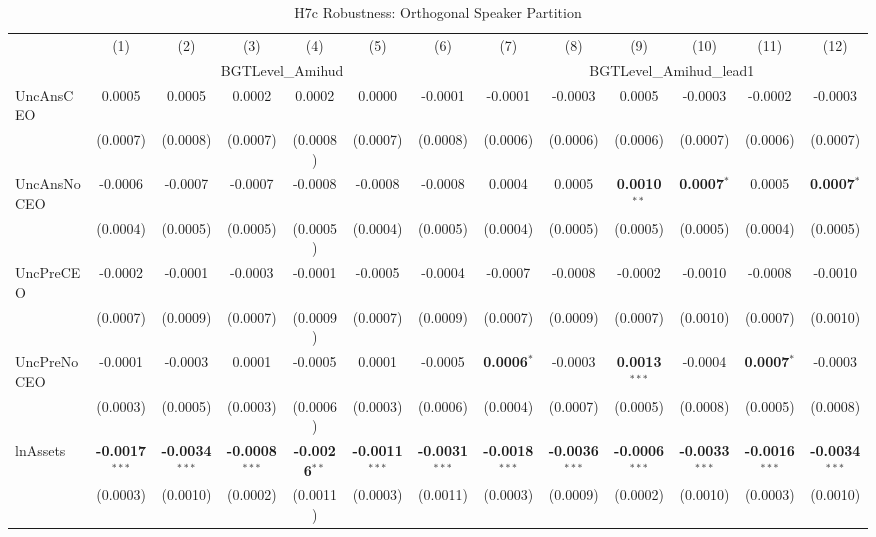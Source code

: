 \begin{landscape}
\begin{table}[H]
\setlength{\tabcolsep}{3pt}
\renewcommand{\arraystretch}{0.85}
\centering
\caption{H7c Robustness: Orthogonal Speaker Partition}
\label{tab:h7c_robust}
\scriptsize
\begin{tabular}{lcccccccccccc}
\toprule
 & (1) & (2) & (3) & (4) & (5) & (6) & (7) & (8) & (9) & (10) & (11) & (12) \\
 & \multicolumn{6}{c}{BGTLevel\_Amihud} & \multicolumn{6}{c}{BGTLevel\_Amihud\_lead1} \\
\cmidrule(lr){2-7} \cmidrule(lr){8-13}
\midrule
UncAnsCEO & 0.0005 & 0.0005 & 0.0002 & 0.0002 & 0.0000 & -0.0001 & -0.0001 & -0.0003 & 0.0005 & -0.0003 & -0.0002 & -0.0003 \\
 & (0.0007) & (0.0008) & (0.0007) & (0.0008) & (0.0007) & (0.0008) & (0.0006) & (0.0006) & (0.0006) & (0.0007) & (0.0006) & (0.0007) \\
UncAnsNoCEO & -0.0006 & -0.0007 & -0.0007 & -0.0008 & -0.0008 & -0.0008 & 0.0004 & 0.0005 & \textbf{0.0010}$^{**}$ & \textbf{0.0007}$^{*}$ & 0.0005 & \textbf{0.0007}$^{*}$ \\
 & (0.0004) & (0.0005) & (0.0005) & (0.0005) & (0.0004) & (0.0005) & (0.0004) & (0.0005) & (0.0005) & (0.0005) & (0.0004) & (0.0005) \\
UncPreCEO & -0.0002 & -0.0001 & -0.0003 & -0.0001 & -0.0005 & -0.0004 & -0.0007 & -0.0008 & -0.0002 & -0.0010 & -0.0008 & -0.0010 \\
 & (0.0007) & (0.0009) & (0.0007) & (0.0009) & (0.0007) & (0.0009) & (0.0007) & (0.0009) & (0.0007) & (0.0010) & (0.0007) & (0.0010) \\
UncPreNoCEO & -0.0001 & -0.0003 & 0.0001 & -0.0005 & 0.0001 & -0.0005 & \textbf{0.0006}$^{*}$ & -0.0003 & \textbf{0.0013}$^{***}$ & -0.0004 & \textbf{0.0007}$^{*}$ & -0.0003 \\
 & (0.0003) & (0.0005) & (0.0003) & (0.0006) & (0.0003) & (0.0006) & (0.0004) & (0.0007) & (0.0005) & (0.0008) & (0.0005) & (0.0008) \\
\midrule
lnAssets & \textbf{-0.0017}$^{***}$ & \textbf{-0.0034}$^{***}$ & \textbf{-0.0008}$^{***}$ & \textbf{-0.0026}$^{**}$ & \textbf{-0.0011}$^{***}$ & \textbf{-0.0031}$^{***}$ & \textbf{-0.0018}$^{***}$ & \textbf{-0.0036}$^{***}$ & \textbf{-0.0006}$^{***}$ & \textbf{-0.0033}$^{***}$ & \textbf{-0.0016}$^{***}$ & \textbf{-0.0034}$^{***}$ \\
 & (0.0003) & (0.0010) & (0.0002) & (0.0011) & (0.0003) & (0.0011) & (0.0003) & (0.0009) & (0.0002) & (0.0010) & (0.0003) & (0.0010) \\

\end{tabular}
\end{table}
\end{landscape}
